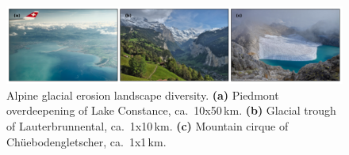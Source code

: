 \documentclass[utf8]{article}
\begin{document}








\clearpage

    \begin{figure}
      \centerline{\includegraphics{alpero_landscape}}
      \caption{%
        Alpine glacial erosion landscape diversity.
        \textbf{(a)} Piedmont overdeepening of Lake Constance, ca.~10x50\,km.
        \textbf{(b)} Glacial trough of Lauterbrunnental, ca.~1x10\,km.
        \textbf{(c)} Mountain cirque of Chüebodengletscher, ca.~1x1\,km.}
      \label{fig:landscape}
    \end{figure}
\end{document}
